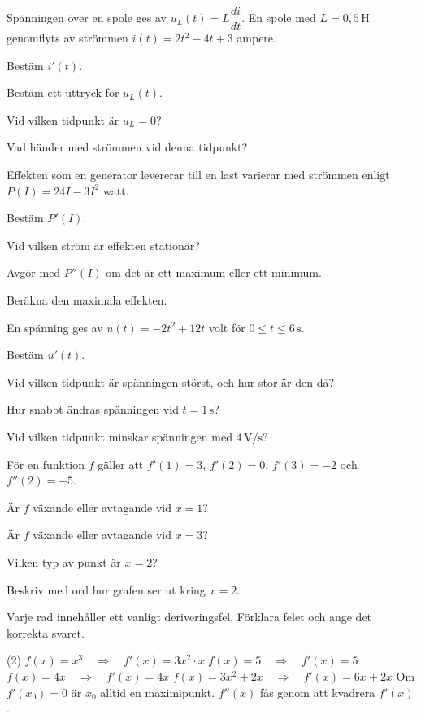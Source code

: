 Spänningen över en spole ges av $u_L(t) = L\dfrac{di}{dt}$. En spole med $L = 0{,}5\,\text{H}$
genomflyts av strömmen $i(t) = 2t^2 - 4t + 3$ ampere.
\begin{parts}
  \item Bestäm $i'(t)$.
  \item Bestäm ett uttryck för $u_L(t)$.
  \item Vid vilken tidpunkt är $u_L = 0$?
  \item Vad händer med strömmen vid denna tidpunkt?
\end{parts}

Effekten som en generator levererar till en last varierar med strömmen enligt
$P(I) = 24I - 3I^2$ watt.
\begin{parts}
  \item Bestäm $P'(I)$.
  \item Vid vilken ström är effekten stationär?
  \item Avgör med $P''(I)$ om det är ett maximum eller ett minimum.
  \item Beräkna den maximala effekten.
\end{parts}

En spänning ges av $u(t) = -2t^2 + 12t$ volt för $0 \leq t \leq 6\,\text{s}$.
\begin{parts}
  \item Bestäm $u'(t)$.
  \item Vid vilken tidpunkt är spänningen störst, och hur stor är den då?
  \item Hur snabbt ändras spänningen vid $t = 1\,\text{s}$?
  \item Vid vilken tidpunkt minskar spänningen med $4\,\text{V/s}$?
\end{parts}

För en funktion $f$ gäller att $f'(1) = 3$, $f'(2) = 0$, $f'(3) = -2$ och $f''(2) = -5$.
\begin{parts}
  \item Är $f$ växande eller avtagande vid $x = 1$?
  \item Är $f$ växande eller avtagande vid $x = 3$?
  \item Vilken typ av punkt är $x = 2$?
  \item Beskriv med ord hur grafen ser ut kring $x = 2$.
\end{parts}

Varje rad innehåller ett vanligt deriveringsfel. Förklara felet och ange det korrekta svaret.
\begin{delar}(2)
  \task $f(x) = x^3 \quad \Rightarrow \quad f'(x) = 3x^2 \cdot x$
  \task $f(x) = 5 \quad \Rightarrow \quad f'(x) = 5$
  \task $f(x) = 4x \quad \Rightarrow \quad f'(x) = 4x$
  \task $f(x) = 3x^2 + 2x \quad \Rightarrow \quad f'(x) = 6x + 2x$
  \task* Om $f'(x_0) = 0$ är $x_0$ alltid en maximipunkt.
  \task* $f''(x)$ fås genom att kvadrera $f'(x)$.
\end{delar}

